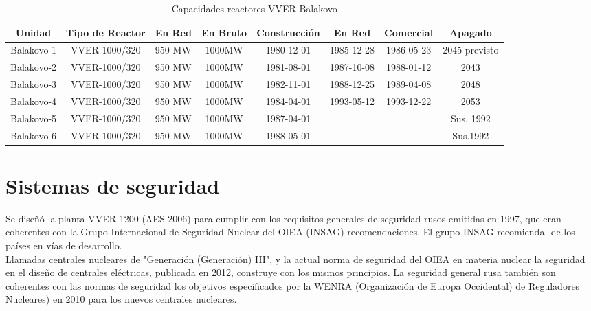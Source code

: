 \documentclass[]{article}
\begin{document}
\begin{table}[h!]
	\centering
	\begin{tabular}{|c|c|c|c|c|c|c|c|}
		\hline
		Unidad     & Tipo de Reactor & En Red & En Bruto & Construcción & En Red & Comercial & Apagado                            \\ \hline
		Balakovo-1 & VVER-1000/320   & 950 MW & 1000MW   & 1980-12-01   & 1985-12-28    & 1986-05-23    & 2045 previsto                      \\ \hline
		Balakovo-2 & VVER-1000/320   & 950 MW & 1000MW   & 1981-08-01   & 1987-10-08    & 1988-01-12    & 2043                       \\ \hline
		Balakovo-3 & VVER-1000/320   & 950 MW & 1000MW   & 1982-11-01   & 1988-12-25    & 1989-04-08    & 2048                       \\ \hline
		Balakovo-4 & VVER-1000/320   & 950 MW & 1000MW   & 1984-04-01   & 1993-05-12    & 1993-12-22    & 2053                       \\ \hline
		Balakovo-5 & VVER-1000/320   & 950 MW & 1000MW   & 1987-04-01   &               &               &  Sus. 1992 \\ \hline
		Balakovo-6 & VVER-1000/320   & 950 MW & 1000MW   & 1988-05-01   &               &               &  Sus.1992 \\ \hline
	\end{tabular}
\caption{Capacidades reactores VVER Balakovo}
\end{table}
\citep{vverWiki}

\section{Sistemas de seguridad}

Se diseñó la planta VVER-1200 (AES-2006)
para cumplir con los requisitos generales de seguridad rusos
emitidas en 1997, que eran coherentes con la
Grupo Internacional de Seguridad Nuclear del OIEA (INSAG)
recomendaciones. El grupo INSAG recomienda-
de los países en vías de desarrollo.\\

Llamadas centrales nucleares de "Generación (Generación) III",
y la actual norma de seguridad del OIEA en materia nuclear
la seguridad en el diseño de centrales eléctricas, publicada en 2012, construye
con los mismos principios. La seguridad general rusa
también son coherentes con las normas de seguridad
los objetivos especificados por la WENRA (Organización de Europa Occidental)
de Reguladores Nucleares) en 2010 para los nuevos
centrales nucleares.\\
\end{document}
